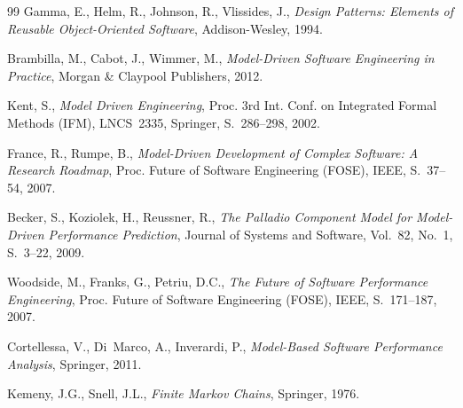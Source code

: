 ﻿\documentclass[a4paper,12pt]{report}
\theoremstyle{definition}
\begin{document}
\begin{thebibliography}{99}
	Gamma, E., Helm, R., Johnson, R., Vlissides, J.,
	\textit{Design Patterns: Elements of Reusable Object-Oriented
		Software},
	Addison-Wesley, 1994.

	Brambilla, M., Cabot, J., Wimmer, M.,
	\textit{Model-Driven Software Engineering in Practice},
	Morgan \& Claypool Publishers, 2012.

	Kent, S.,
	\textit{Model Driven Engineering},
	Proc. 3rd Int. Conf. on Integrated Formal Methods (IFM),
	LNCS~2335, Springer, S.~286--298, 2002.

	France, R., Rumpe, B.,
	\textit{Model-Driven Development of Complex Software:
		A Research Roadmap},
	Proc. Future of Software Engineering (FOSE),
	IEEE, S.~37--54, 2007.

	Becker, S., Koziolek, H., Reussner, R.,
	\textit{The Palladio Component Model for Model-Driven Performance
		Prediction},
	Journal of Systems and Software, Vol.~82, No.~1, S.~3--22, 2009.

	Woodside, M., Franks, G., Petriu, D.C.,
	\textit{The Future of Software Performance Engineering},
	Proc. Future of Software Engineering (FOSE),
	IEEE, S.~171--187, 2007.

	Cortellessa, V., Di~Marco, A., Inverardi, P.,
	\textit{Model-Based Software Performance Analysis},
	Springer, 2011.

	Kemeny, J.G., Snell, J.L.,
	\textit{Finite Markov Chains},
	Springer, 1976.

\end{thebibliography}
\end{document}
